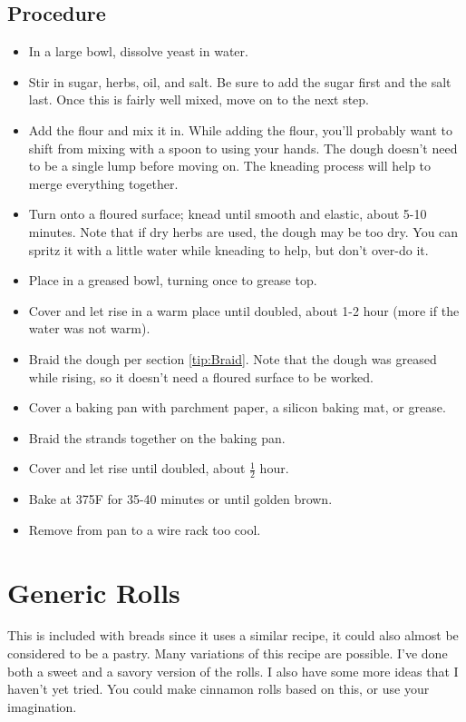 \documentclass[10pt, openany]{book}
\begin{document}
\subsection{Procedure}
\begin{itemize}
  \item In a large bowl, dissolve yeast in water.
  \item Stir in sugar, herbs, oil, and salt.  Be sure to add the sugar first and the salt last.  Once this is fairly well mixed, move on to the next step.
  \item Add the flour and mix it in.  While adding the flour, you'll probably want to shift from mixing with a spoon to using your hands.  The dough doesn't need to be a single lump before moving on.  The kneading process will help to merge everything together.
  \item Turn onto a floured surface; knead until smooth and elastic, about 5-10 minutes.  Note that if dry herbs are used, the dough may be too dry.  You can spritz it with a little water while kneading to help, but don't over-do it.
  \item Place in a greased bowl, turning once to grease top.
  \item Cover and let rise in a warm place until doubled, about 1-2 hour (more if the water was not warm).
  \item Braid the dough per section \ref{tip:Braid}.  Note that the dough was greased while rising, so it doesn't need a floured surface to be worked.
  \item Cover a baking pan with parchment paper, a silicon baking mat, or grease.
  \item Braid the strands together on the baking pan.
  \item Cover and let rise until doubled, about $\frac{1}{2}$ hour.
  \item Bake at 375\degree{}F for 35-40 minutes or until golden brown.
  \item Remove from pan to a wire rack too cool.
\end{itemize}

\section{Generic Rolls}
\label{bread:Rolls}
This is included with breads since it uses a similar recipe, it could also almost be considered to be a pastry.  Many variations of this recipe are possible.  I've done both a sweet and a savory version of the rolls.  I also have some more ideas that I haven't yet tried.  You could make cinnamon rolls based on this, or use your imagination.
\end{document}
